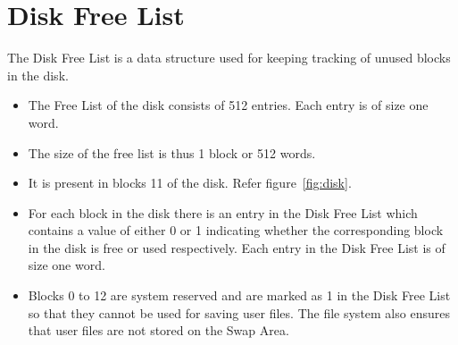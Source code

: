 \documentclass[11pt]{article}
\begin{document}
\section{Disk Free List}
\label{lbl:disklst}
The Disk Free List is a data structure used for keeping tracking of unused blocks in the disk. 


\begin{itemize}
	\item  The Free List of the disk consists of 512 entries. Each entry is of size one word.
	\item  The size of the free list is thus 1 block or 512 words.
	\item  It is present in blocks 11 of the disk. Refer figure~\ref{fig:disk}. 
	\item  For each block in the disk there is an entry in the Disk Free List which contains a value of either 0 or 1 indicating whether the corresponding block in the disk is free or used respectively. Each entry in the Disk Free List is of size one word.  
	\item Blocks 0 to 12 are system reserved and are marked as 1 in the Disk Free List so that they cannot be used for saving user files. The file system also ensures that user files are not stored on the Swap Area.
\end{itemize}
\end{document}
